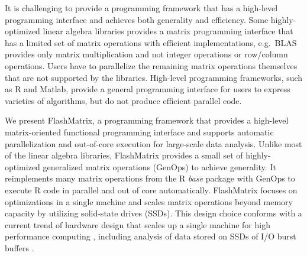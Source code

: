 
It is challenging to provide a programming framework that has a high-level
programming interface and achieves both generality and efficiency.
Some highly-optimized linear algebra libraries \cite{mkl, openblas, elemental,
trilinos, petsc} provides a matrix programming interface that has a limited
set of matrix operations with efficient implementations, e.g.~BLAS provides
only matrix multiplication and not integer operations or row/column operations.
Users have to parallelize the remaining matrix
operations themselves that are not supported by the libraries. 
High-level programming frameworks, such as R and Matlab, provide a
general programming interface for users to express varieties of algorithms, but
do not produce efficient parallel code.


We present FlashMatrix, a programming framework that provides a high-level
matrix-oriented functional programming interface and supports automatic
parallelization and out-of-core execution for large-scale data analysis.
Unlike most of the linear algebra libraries, FlashMatrix provides a small
set of highly-optimized generalized matrix operations (GenOps) to achieve
generality. It reimplements many matrix operations from the R \textit{base}
package with GenOps to execute R code in parallel and
out of core automatically. FlashMatrix focuses on optimizations in
a single machine and scales matrix operations beyond memory capacity by utilizing
solid-state drives (SSDs). This design choice conforms with a current trend of
hardware design that scales up a single machine for high performance computing
\cite{Ang14}, including analysis of data stored on SSDs of I/O burst buffers
\cite{burst}.


